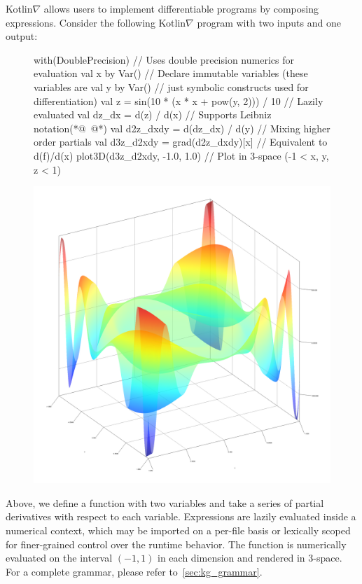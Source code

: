 Kotlin$\nabla$ allows users to implement differentiable programs by composing expressions. Consider the following Kotlin$\nabla$ program with two inputs and one output:
%
\begin{figure}[H] \label{fig:basic_kotlingrad}
\begin{unbreakablekotlin}
with(DoublePrecision) { // Uses double precision numerics for evaluation
  val x by Var() // Declare immutable variables (these variables are
  val y by Var() // just symbolic constructs used for differentiation)
  val z = sin(10 * (x * x + pow(y, 2))) / 10 // Lazily evaluated
  val dz_dx = d(z) / d(x) // Supports Leibniz notation(*@~\citep{christianson2012leibniz}@*)
  val d2z_dxdy = d(dz_dx) / d(y) // Mixing higher order partials
  val d3z_d2xdy = grad(d2z_dxdy)[x] // Equivalent to d(f)/d(x)
  plot3D(d3z_d2xdy, -1.0, 1.0) // Plot in 3-space (-1 < x, y, z < 1)
}
\end{unbreakablekotlin}
\includegraphics[scale=0.43]{../figures/plot_result.png}
\end{figure}
%
Above, we define a function with two variables and take a series of partial derivatives with respect to each variable. Expressions are lazily evaluated inside a numerical context, which may be imported on a per-file basis or lexically scoped for finer-grained control over the runtime behavior. The function is numerically evaluated on the interval $(-1, 1)$ in each dimension and rendered in 3-space. For a complete grammar, please refer to~\autoref{sec:kg_grammar}.
